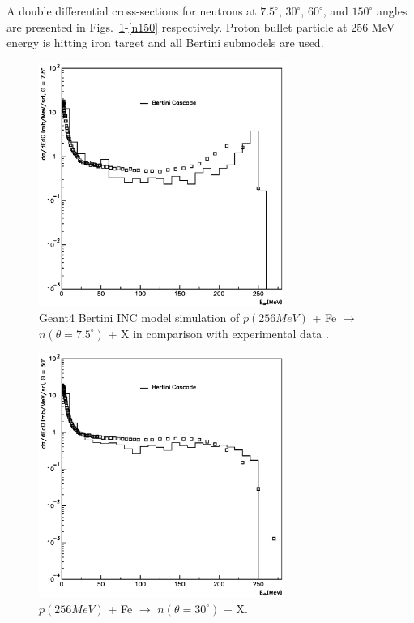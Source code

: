 \documentclass[twocolumn,twoside,slac]{revtex4}
\begin{document}
A double differential cross-sections for neutrons at $7.5^{\circ}$, $30^{\circ}$, $60^{\circ}$, and $150^{\circ}$ angles are presented in Figs.~\ref{n7}-\ref{n150} respectively. Proton bullet particle at 256 MeV energy is hitting iron target and all Bertini submodels are used.



\begin{figure}
  \includegraphics[width=80mm, keepaspectratio]{pn_fe_256_n_a0.eps}
  \caption{Geant4 Bertini INC model simulation of $p(256 MeV)$ + Fe $\rightarrow$ $n(\theta = 7.5^{\circ})$ + X in comparison with experimental data \cite{benchmarkData02}.}
  \label{n7}
\end{figure}

\begin{figure}
  \includegraphics[width=80mm,keepaspectratio]{pn_fe_256_n_a1.eps}
  \caption{$p(256 MeV)$ + Fe $\rightarrow$ $n(\theta = 30^{\circ})$ + X.}
  \label{n30}
\end{figure}
\end{document}
